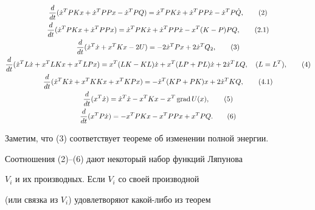 \begin{gather}


\frac{d}{dt}(\Dot{x}^{T}PKx+ \Dot{x}^{T}PPx- \Dot{x}^{T}PQ)=


\Dot{x}^{T}PK\Dot{x} + \Dot{x}^{T}PP \Dot{x}-


\Dot{x}^{T}P \Dot{Q}, \tag{2}\\


%


\frac{d}{dt}(\Dot{x}^{T}PKx+ \Dot{x}^{T}PPx)=


\Dot{x}^{T}PK\Dot{x} + \Dot{x}^{T}PP \Dot{x}- {x}^{T}(K-P)PQ, \tag{2.1} \\


%


\frac{d}{dt}(\Dot{x}^{T} \Dot{x}+ x^{T}Kx-2 U)=


-2 \Dot{x}^{T}Px+2\Dot x^{T} Q_{2}, \tag{3} \\


%


\frac{d}{dt}(\Dot{x}^{T}L\Dot{x} + x^{T}LKx+x^{T}LPx)=


x^{T}(LK-KL) \Dot{x}+x^{T}(LP+PL) \Dot{x}+2\Dot{x}^{T}LQ,\quad


(L=L^{T}), \tag{4}\\


%


\frac{d}{dt}(\Dot{x}^{T}K \Dot{x}+ x^{T}KKx + x^{T}KPx)=


-\Dot{x}^{T}(KP+PK)x+2 \Dot x^{T} KQ, \tag{4.1} \\


%


\frac{d}{dt}(x^{T} \Dot{x})= \Dot{x}^{T}


\Dot{x}-x^{T}Kx-x^{T}\grad U(x), \tag{5}\\


%


\frac{d}{dt} (x^{T}P \Dot{x})=-x^{T}PKx-x^{T}PPx+x^{T}PQ. \tag{6}


\end{gather}





Заметим, что (3) соответствует теореме об изменении полной энергии.





Соотношения (2)--(6) дают некоторый набор функций Ляпунова


$V_{i}$ и их производных. Если $V_{i}$ со своей производной


(или связка из $V_{i}$) удовлетворяют какой-либо из теорем



